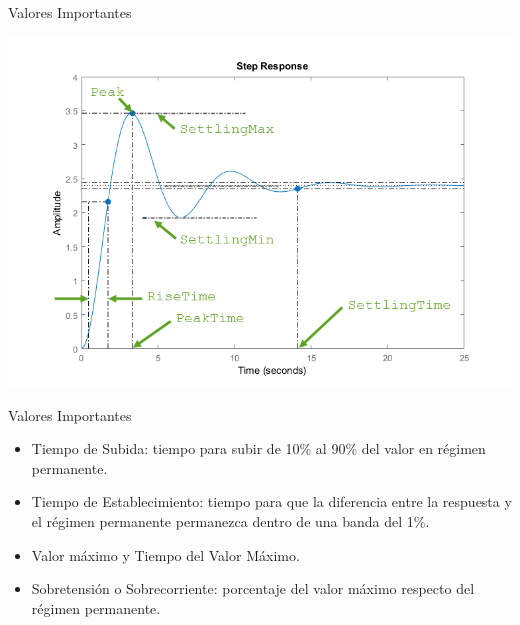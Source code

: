 \documentclass[xcolor={usenames,svgnames,dvipsnames}]{beamer}
\begin{document}
\begin{frame}[label={sec:orge16b534}]{Valores Importantes}
\begin{center}
\includegraphics[width=.9\linewidth]{figs/RespuestaEscalon_SegundoOrden.png}
\end{center}
\end{frame}

\begin{frame}[label={sec:orgaa8dcee}]{Valores Importantes}
\begin{itemize}
\item \alert{Tiempo de Subida}: tiempo para subir de 10\% al 90\% del valor en régimen permanente.

\item \alert{Tiempo de Establecimiento}: tiempo para que la diferencia entre la respuesta y el régimen permanente permanezca dentro de una banda del 1\%.

\item \alert{Valor máximo} y \alert{Tiempo del Valor Máximo}.

\item \alert{Sobretensión} o \alert{Sobrecorriente}: porcentaje del valor máximo respecto del régimen permanente.
\end{itemize}
\end{frame}
\end{document}
